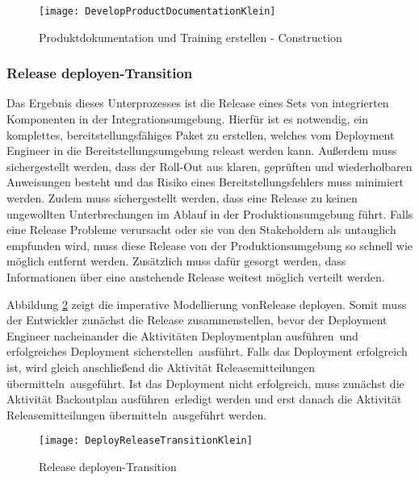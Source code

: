 \begin{figure}[!htbp]
\begin{center}
  \texttt{[image: DevelopProductDocumentationKlein]} %
  \caption{Produktdokumentation und Training erstellen - Construction}
  \label{fig:DevelopProductDocumentationKlein}
\end{center}
\end{figure}


\subsubsection{Release deployen-Transition}


Das Ergebnis dieses Unterprozesses ist die Release eines Sets von integrierten Komponenten in der Integrationsumgebung. Hierfür ist es notwendig, ein komplettes, bereitstellungsfähiges Paket zu erstellen, welches vom Deployment Engineer in die Bereitstellungsumgebung releast werden kann.\newline
 Außerdem muss sichergestellt werden, dass der Roll-Out aus klaren, geprüften und wiederholbaren Anweisungen besteht und das Risiko eines Bereitstellungsfehlers muss minimiert werden. \newline
 Zudem muss sichergestellt werden, dass eine Release zu keinen ungewollten Unterbrechungen im Ablauf in der Produktionsumgebung führt. Falls eine Release Probleme verursacht oder sie von den Stakeholdern als untauglich empfunden wird, muss diese Release von der Produktionsumgebung so schnell wie möglich entfernt werden. Zusätzlich muss dafür gesorgt werden, dass Informationen über eine anstehende Release weitest möglich verteilt werden.\newline
 
  Abbildung \ref{fig:DeployReleaseTransitionKlein} zeigt die imperative Modellierung von\grqq Release deployen\grqq.
  Somit muss der Entwickler zunächst die \grqq Release zusammenstellen\grqq, bevor der Deployment Engineer nacheinander die Aktivitäten \grqq Deploymentplan ausführen\grqq \ und \grqq erfolgreiches Deployment sicherstellen\grqq \ ausführt. Falls das Deployment erfolgreich ist, wird gleich anschließend die Aktivität \grqq Releasemitteilungen übermitteln\grqq \ ausgeführt. Ist das Deployment nicht erfolgreich, muss zunächst die Aktivität \grqq Backoutplan ausführen\grqq \ erledigt werden und erst danach die Aktivität \grqq Releasemitteilungen übermitteln\grqq \ ausgeführt werden.


\begin{figure}[!htbp]
\begin{center}
  \texttt{[image: DeployReleaseTransitionKlein]} %
  \caption{Release deployen-Transition}
  \label{fig:DeployReleaseTransitionKlein}
\end{center}
\end{figure}



